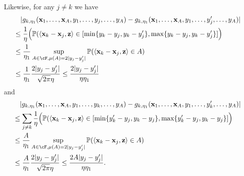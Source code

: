 Likewise, for any $j\neq k$ we have 
\begin{align*}
    &\quad|g_{k,\trunprob}(\bx_1,\ldots,\bx_A,y_1,\ldots,y_j,\ldots,y_A)-g_{k,\trunprob}(\bx_1,\ldots,\bx_A,y_1,\ldots,y_j',\ldots,y_A)|\\
    &\leq
    \frac{1}{\Trunregp}
    \Big(\P( \<\bx_k-\bx_j,\bz\>\in[\min\{y_k-y_j,y_k-y_j'\},\max\{y_k-y_j,y_k-y_j'\}]\Big)\\
      &\leq 
      \frac{1}{\trunprob}\sup_{A\in\cF,\mu(A)=2|y_j-y_j'|}\P(\<\bx_k-\bx_j,\bz\>\in A)\\
      &\leq
   \frac{1}{\trunprob}\frac{2|y_j-y_j'|}{\sqrt{2\pi}\Trunregp}\leq \frac{2|y_j-y_j'|}{\Trunregp\trunprob} 
\end{align*} and
\begin{align*}
    &\quad|g_{k,\trunprob}(\bx_1,\ldots,\bx_A,y_1,\ldots,y_k,\ldots,y_A)-g_{k,\trunprob}(\bx_1,\ldots,\bx_A,y_1,\ldots,y_k',\ldots,y_A)|\\
    &\leq
    \sum_{j\neq k}\frac{1}{\Trunregp}
    \Big(\P( \<\bx_k-\bx_j,\bz\>\in[\min\{y_k'-y_j,y_k-y_j\},\max\{y_k'-y_j,y_k-y_j\}]\Big)\\
      &\leq 
      \frac{A}{\trunprob}\sup_{A\in\cF,\mu(A)=2|y_j-y_j'|}\P(\<\bx_k-\bx_j,\bz\>\in A)\\
      &\leq
   \frac{A}{\trunprob}\frac{2|y_j-y_j'|}{\sqrt{2\pi}\Trunregp}\leq \frac{2A|y_j-y_j'|}{\Trunregp\trunprob}.
\end{align*}











